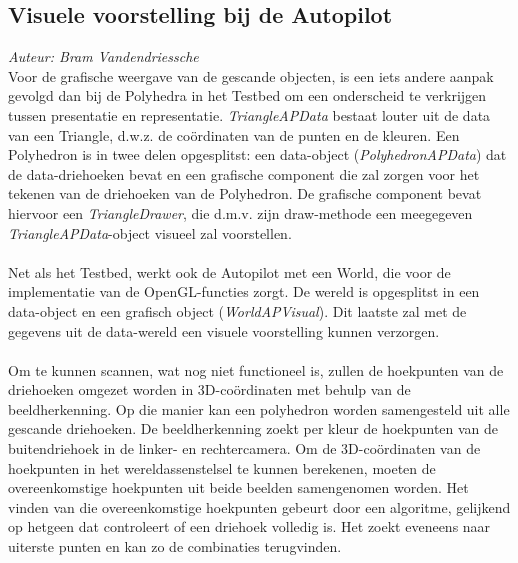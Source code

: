 \subsection{Visuele voorstelling bij de Autopilot}
{\em Auteur: Bram Vandendriessche}\\

\noindent
Voor de grafische weergave van de gescande objecten, is een iets andere aanpak gevolgd dan bij de Polyhedra in het Testbed om een onderscheid te verkrijgen tussen presentatie en representatie. \textit{TriangleAPData} bestaat louter uit de data van een Triangle, d.w.z. de co\"ordinaten van de punten en de kleuren. Een Polyhedron is in twee delen opgesplitst: een data-object (\textit{PolyhedronAPData}) dat de data-driehoeken bevat en een grafische component die zal zorgen voor het tekenen van de driehoeken van de Polyhedron. De grafische component bevat hiervoor een \textit{TriangleDrawer}, die d.m.v. zijn draw-methode een meegegeven \textit{TriangleAPData}-object visueel zal voorstellen.\\
\\
Net als het Testbed, werkt ook de Autopilot met een World, die voor de implementatie van de OpenGL-functies zorgt. De wereld is opgesplitst in een data-object en een grafisch object (\textit{WorldAPVisual}). Dit laatste zal met de gegevens uit de data-wereld een visuele voorstelling kunnen verzorgen.\\
\\
Om te kunnen scannen, wat nog niet functioneel is, zullen de hoekpunten van de driehoeken omgezet worden in 3D-co\"ordinaten met behulp van de beeldherkenning. Op die manier kan een polyhedron worden samengesteld uit alle gescande driehoeken. De beeldherkenning zoekt per kleur de hoekpunten van de buitendriehoek in de linker- en rechtercamera. Om de 3D-co\"ordinaten van de hoekpunten in het wereldassenstelsel te kunnen berekenen, moeten de overeenkomstige hoekpunten uit beide beelden samengenomen worden. Het vinden van die overeenkomstige hoekpunten gebeurt door een algoritme, gelijkend op hetgeen dat controleert of een driehoek volledig is. Het zoekt eveneens naar uiterste punten en kan zo de combinaties terugvinden.  